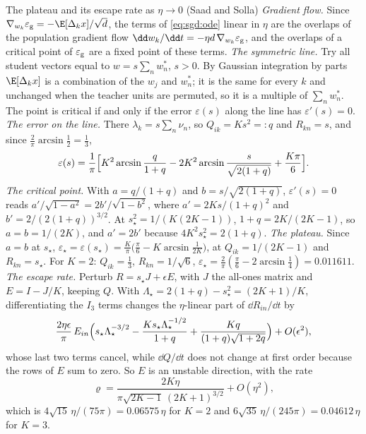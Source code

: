 \begin{refsection}
\begin{computation}{The plateau and its escape rate as $\eta\to0$ (Saad and Solla)}\label{comp:sgd:plateau}
\step \emph{Gradient flow.} Since $\nabla_{w_k}\sgdeg=-\E[\Delta_kx]/\sqrt d$, the terms of \eqref{eq:sgd:ode} linear in $\eta$ are the overlaps of the population gradient flow $\dd w_k/\dd t=-\eta d\,\nabla_{w_k}\sgdeg$, and the overlaps of a critical point of $\varepsilon_{\mathrm g}$ are a fixed point of these terms.
\step \emph{The symmetric line.} Try all student vectors equal to $w=s\sum_nw^*_n$, $s>0$. By Gaussian integration by parts $\E[\Delta_kx]$ is a combination of the $w_j$ and $w^*_n$; it is the same for every $k$ and unchanged when the teacher units are permuted, so it is a multiple of $\sum_nw^*_n$. The point is critical if and only if the error $\varepsilon(s)$ along the line has $\varepsilon'(s)=0$.
\step \emph{The error on the line.} There $\lambda_k=s\sum_n\nu_n$, so $Q_{ik}=Ks^2=:q$ and $R_{kn}=s$, and since $\frac2\pi\arcsin\frac12=\frac13$,
\[
\varepsilon(s)=\frac1\pi\Bigl[K^2\arcsin\frac q{1+q}-2K^2\arcsin\frac s{\sqrt{2(1+q)}}+\frac{K\pi}6\Bigr].
\]
\step \emph{The critical point.} With $a=q/(1+q)$ and $b=s/\sqrt{2(1+q)}$, $\varepsilon'(s)=0$ reads $a'/\sqrt{1-a^2}=2b'/\sqrt{1-b^2}$, where $a'=2Ks/(1+q)^2$ and $b'=2/(2(1+q))^{3/2}$. At $s_\star^2=1/(K(2K-1))$, $1+q=2K/(2K-1)$, so $a=b=1/(2K)$, and $a'=2b'$ because $4K^2s_\star^2=2(1+q)$.
\step \emph{The plateau.} Since $a=b$ at $s_\star$, $\varepsilon_\star=\varepsilon(s_\star)=\frac K\pi\bigl(\frac\pi6-K\arcsin\frac1{2K}\bigr)$, at $Q_{ik}=1/(2K-1)$ and $R_{kn}=s_\star$. For $K=2$: $Q_{ik}=\frac13$, $R_{kn}=1/\sqrt6$, $\varepsilon_\star=\frac2\pi(\frac\pi6-2\arcsin\frac14)=0.011611$.
\step \emph{The escape rate.} Perturb $R=s_\star J+\epsilon E$, with $J$ the all-ones matrix and $E=I-J/K$, keeping $Q$. With $\Lambda_\star=2(1+q)-s_\star^2=(2K+1)/K$, differentiating the $I_3$ terms changes the $\eta$-linear part of $\dd R_{in}/\dd t$ by
\[
\frac{2\eta\epsilon}\pi\,E_{in}\Bigl(s_\star\Lambda_\star^{-3/2}-\frac{Ks_\star\Lambda_\star^{-1/2}}{1+q}+\frac{Kq}{(1+q)\sqrt{1+2q}}\Bigr)+O(\epsilon^2),
\]
whose last two terms cancel, while $\dd Q/\dd t$ does not change at first order because the rows of $E$ sum to zero. So $E$ is an unstable direction, with the rate
\[
\varrho=\frac{2K\eta}{\pi\sqrt{2K-1}\,(2K+1)^{3/2}}+O(\eta^2),
\]
which is $4\sqrt{15}\,\eta/(75\pi)=0.06575\,\eta$ for $K=2$ and $6\sqrt{35}\,\eta/(245\pi)=0.04612\,\eta$ for $K=3$.
\end{computation}


\end{refsection}

